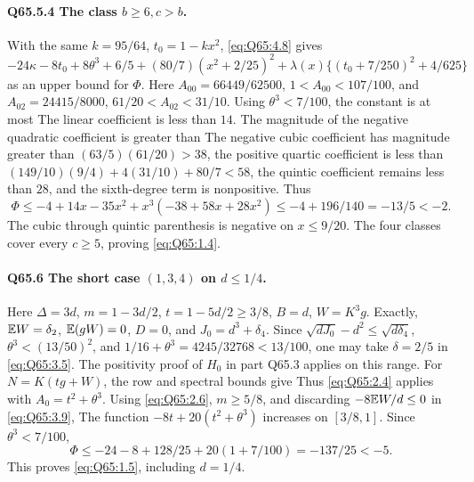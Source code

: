 \paragraph{Q65.5.4 The class \(b\ge\allowbreak 6,\allowbreak c>\allowbreak b\).}
With the same \(k=\allowbreak 95/64\), \(t_0=\allowbreak 1-kx^2\),
\eqref{eq:Q65:4.8} gives
\begin{equation}\tag{Q65.5.9}\label{eq:Q65:5.9}
-24\kappa-8t_0+8\theta^3+6/5+(80/7)(x^2+2/25)^2
 +\lambda(x)\{(t_0+7/250)^2+4/625\}
\end{equation}
as an upper bound for \(\Phi\).
Here \(A_{00}=\allowbreak 66449/62500\), \(1<\allowbreak A_{00}<\allowbreak 107/100\), and
\(A_{02}=\allowbreak 24415/8000\), \(61/20<\allowbreak A_{02}<\allowbreak 31/10\).
Using \(\theta^3<\allowbreak 7/100\), the constant is at most
The linear coefficient is less than \(14\).
The magnitude of the negative quadratic coefficient is greater than
The negative cubic coefficient has magnitude greater than
\((63/5)(61/20)>\allowbreak 38\), the positive quartic coefficient is less than
\((149/10)(9/4)+4(31/10)+80/7<\allowbreak 58\), the quintic coefficient remains
less than \(28\), and the sixth-degree term is nonpositive. Thus
\begin{equation}\tag{Q65.5.10}\label{eq:Q65:5.10}
\Phi\le-4+14x-35x^2+x^3(-38+58x+28x^2)
 \le-4+196/140=-13/5<-2.
\end{equation}
The cubic through quintic parenthesis is negative on \(x\le\allowbreak 9/20\).
The four classes cover every \(c\ge\allowbreak 5\), proving \eqref{eq:Q65:1.4}.

\paragraph{Q65.6 The short case \((1,\allowbreak 3,\allowbreak 4)\) on \(d\le\allowbreak 1/4\).}
Here \(\Delta=\allowbreak 3d\), \(m=\allowbreak 1-3d/2\), \(t=\allowbreak 1-5d/2\ge\allowbreak 3/8\),
\(B=\allowbreak d\), \(W=\allowbreak K^3g\). Exactly,
\(\mathbb E W=\allowbreak \delta_2\), \(\mathbb E(gW)=\allowbreak 0\), \(D=\allowbreak 0\), and
\(J_0=\allowbreak d^3+\delta_4\).
Since \(\sqrt{dJ_0}-d^2\le\allowbreak \sqrt{d\delta_4}\),
\(\theta^3<\allowbreak (13/50)^2\), and
\(1/16+\theta^3=\allowbreak 4245/32768<\allowbreak 13/100\), one may take
\(\delta=\allowbreak 2/5\) in \eqref{eq:Q65:3.5}.
The positivity proof of \(H_0\) in part Q65.3 applies on this range.
For \(N=\allowbreak K(tg+W)\), the row and spectral bounds give
Thus \eqref{eq:Q65:2.4} applies with \(A_0=\allowbreak t^2+\theta^3\).
Using \eqref{eq:Q65:2.6}, \(m\ge\allowbreak 5/8\), and discarding
\(-8\mathbb E W/d\le\allowbreak 0\) in \eqref{eq:Q65:3.9},
The function \(-8t+20(t^2+\theta^3)\) increases on \([3/8,\allowbreak 1]\).
Since \(\theta^3<\allowbreak 7/100\),
\begin{equation}\tag{Q65.6.1}\label{eq:Q65:6.1}
\Phi\le-24-8+128/25+20(1+7/100)=-137/25<-5.
\end{equation}
This proves \eqref{eq:Q65:1.5}, including \(d=\allowbreak 1/4\).

